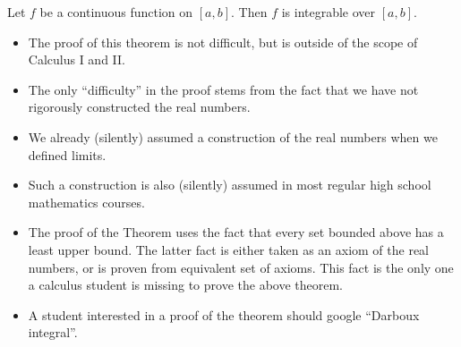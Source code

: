 \begin{frame}
\begin{theorem}
Let $f$ be a continuous function on $[a,b]$. Then $f$ is integrable over $[a,b]$.
\end{theorem}
\begin{itemize}
\item The proof of this theorem is not difficult, but is outside of the scope of Calculus I and II.
\item The only ``difficulty'' in the proof stems from the fact that we have not rigorously constructed the real numbers. 
\item We already (silently) assumed a construction of the real numbers when we defined limits. 
\item Such a construction is also (silently) assumed in most regular high school mathematics courses.
\item  The proof of the Theorem uses the fact that every set bounded above has a least upper bound. The latter fact is either taken as an axiom of the real numbers, or is proven from equivalent set of axioms. This fact is the only one a calculus student is missing to prove the above theorem.
\item A student interested in a proof of the theorem should google ``Darboux integral''.
\end{itemize}

\end{frame}


